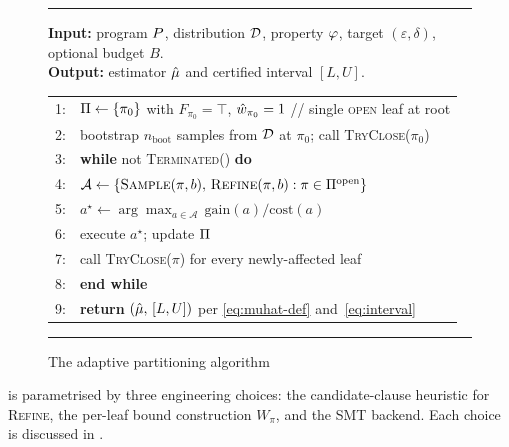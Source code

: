 \begin{figure}[t]
  \caption{The \toolname{} adaptive partitioning algorithm}
  \label{alg:asip}
  \hrule\vspace{0.4em}
  \textbf{Input:} program $P$, distribution $\mathcal{D}$, property
    $\varphi$, target $(\varepsilon, \delta)$, optional budget $B$.\\
  \textbf{Output:} estimator $\hat{\mu}$ and certified interval $[L,U]$.
  \begin{flushleft}
  \begin{tabular}{rl}
    1: & $\Pi \gets \{\pi_0\}$ with $F_{\pi_0} = \top$,
         $\hat{w}_{\pi_0} = 1$ \hspace{1.5em}// single \textsc{open}
         leaf at root\\
    2: & bootstrap $n_{\mathrm{boot}}$ samples from $\mathcal{D}$ at
         $\pi_0$;\; call \textsc{TryClose}($\pi_0$)\\
    3: & \textbf{while} not \textsc{Terminated}() \textbf{do}\\
    4: & \quad $\mathcal{A} \gets
         \{\textsc{Sample}(\pi,b),\,\textsc{Refine}(\pi,b)
           : \pi \in \Pi^{\mathrm{open}}\}$\\
    5: & \quad $a^\star \gets
         \arg\max_{a \in \mathcal{A}}\,\mathrm{gain}(a)/\mathrm{cost}(a)$\\
    6: & \quad execute $a^\star$;\; update $\Pi$\\
    7: & \quad call \textsc{TryClose}($\pi$) for every newly-affected
         leaf\\
    8: & \textbf{end while}\\
    9: & \textbf{return} $(\hat{\mu},\,[L,U])$ per
         \eqref{eq:muhat-def} and~\eqref{eq:interval}\\
  \end{tabular}
  \end{flushleft}
  \vspace{0.2em}\hrule
\end{figure}

\toolname{} is parametrised by three engineering choices: the
candidate-clause heuristic for \textsc{Refine}, the per-leaf bound
construction $W_\pi$, and the SMT backend.  Each choice is discussed
in .
